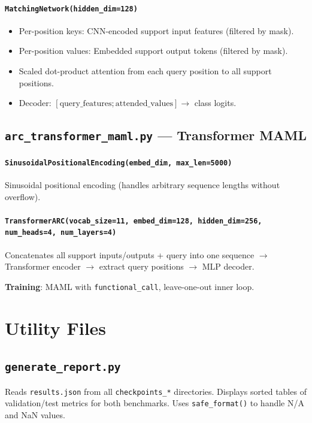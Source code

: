 \documentclass[11pt,a4paper]{article}
\begin{document}
\paragraph{\texttt{MatchingNetwork(hidden\_dim=128)}}
\begin{itemize}[nosep]
  \item Per-position keys: CNN-encoded support input features (filtered by mask).
  \item Per-position values: Embedded support output tokens (filtered by mask).
  \item Scaled dot-product attention from each query position to all support positions.
  \item Decoder: $[\text{query\_features}; \text{attended\_values}] \to$ class logits.
\end{itemize}

\subsection{\texttt{arc\_transformer\_maml.py} --- Transformer MAML}
\paragraph{\texttt{SinusoidalPositionalEncoding(embed\_dim, max\_len=5000)}}
Sinusoidal positional encoding (handles arbitrary sequence lengths without overflow).

\paragraph{\texttt{TransformerARC(vocab\_size=11, embed\_dim=128, hidden\_dim=256, num\_heads=4, num\_layers=4)}}
Concatenates all support inputs/outputs + query into one sequence $\to$ Transformer encoder $\to$ extract query positions $\to$ MLP decoder.

\textbf{Training}: MAML with \texttt{functional\_call}, leave-one-out inner loop.

\section{Utility Files}

\subsection{\texttt{generate\_report.py}}
Reads \texttt{results.json} from all \texttt{checkpoints\_*} directories. Displays sorted tables of validation/test metrics for both benchmarks. Uses \texttt{safe\_format()} to handle N/A and NaN values.
\end{document}
